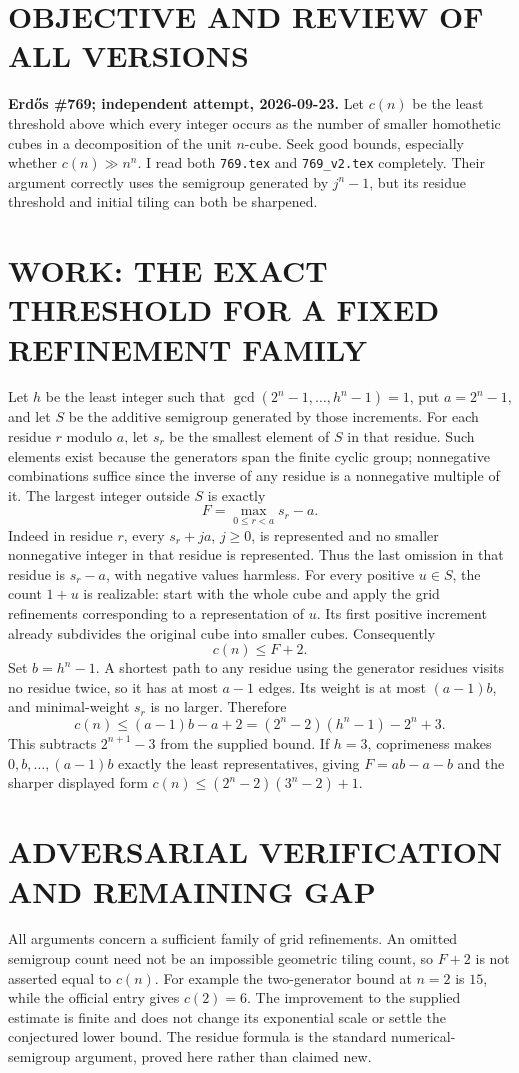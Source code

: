 \section{OBJECTIVE AND REVIEW OF ALL VERSIONS}
\textbf{Erd\H{o}s \#769; independent attempt, 2026-09-23.}
Let $c(n)$ be the least threshold above which every integer occurs as the number of smaller homothetic cubes in a decomposition of the unit $n$-cube. Seek good bounds, especially whether $c(n)\gg n^n$. I read both \texttt{769.tex} and \texttt{769\_v2.tex} completely. Their argument correctly uses the semigroup generated by $j^n-1$, but its residue threshold and initial tiling can both be sharpened.
\section{WORK: THE EXACT THRESHOLD FOR A FIXED REFINEMENT FAMILY}
Let $h$ be the least integer such that $\gcd(2^n-1,\ldots,h^n-1)=1$, put $a=2^n-1$, and let $S$ be the additive semigroup generated by those increments. For each residue $r$ modulo $a$, let $s_r$ be the smallest element of $S$ in that residue. Such elements exist because the generators span the finite cyclic group; nonnegative combinations suffice since the inverse of any residue is a nonnegative multiple of it.
The largest integer outside $S$ is exactly
\[
F=\max_{0\le r<a}s_r-a.
\]
Indeed in residue $r$, every $s_r+ja$, $j\ge0$, is represented and no smaller nonnegative integer in that residue is represented. Thus the last omission in that residue is $s_r-a$, with negative values harmless.
For every positive $u\in S$, the count $1+u$ is realizable: start with the whole cube and apply the grid refinements corresponding to a representation of $u$. Its first positive increment already subdivides the original cube into smaller cubes. Consequently
\[
c(n)\le F+2.
\tag{1}
\]
Set $b=h^n-1$. A shortest path to any residue using the generator residues visits no residue twice, so it has at most $a-1$ edges. Its weight is at most $(a-1)b$, and minimal-weight $s_r$ is no larger. Therefore
\[
c(n)\le(a-1)b-a+2
=(2^n-2)(h^n-1)-2^n+3.
\tag{2}
\]
This subtracts $2^{n+1}-3$ from the supplied bound. If $h=3$, coprimeness makes $0,b,\ldots,(a-1)b$ exactly the least representatives, giving $F=ab-a-b$ and the sharper displayed form $c(n)\le(2^n-2)(3^n-2)+1$.
\section{ADVERSARIAL VERIFICATION AND REMAINING GAP}
All arguments concern a sufficient family of grid refinements. An omitted semigroup count need not be an impossible geometric tiling count, so $F+2$ is not asserted equal to $c(n)$. For example the two-generator bound at $n=2$ is $15$, while the official entry gives $c(2)=6$. The improvement to the supplied estimate is finite and does not change its exponential scale or settle the conjectured lower bound. The residue formula is the standard numerical-semigroup argument, proved here rather than claimed new.
